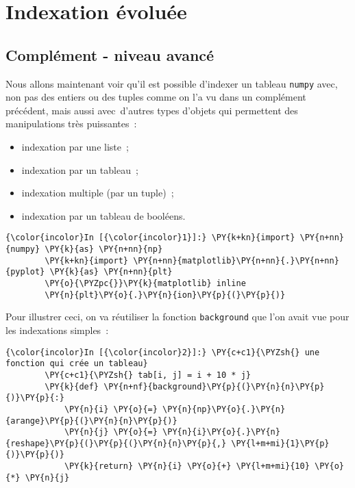     
    
    
    

    

    \hypertarget{indexation-uxe9voluuxe9e}{%
\section{Indexation évoluée}\label{indexation-uxe9voluuxe9e}}

    \hypertarget{compluxe9ment---niveau-avancuxe9}{%
\subsection{Complément - niveau
avancé}\label{compluxe9ment---niveau-avancuxe9}}

    Nous allons maintenant voir qu'il est possible d'indexer un tableau
\texttt{numpy} avec, non pas des entiers ou des tuples comme on l'a vu
dans un complément précédent, mais aussi avec~d'autres types d'objets
qui permettent des manipulations très puissantes~:

\begin{itemize}
\tightlist
\item
  indexation par une liste~;
\item
  indexation par un tableau~;
\item
  indexation multiple (par un tuple)~;
\item
  indexation par un tableau de booléens.
\end{itemize}

    \begin{Verbatim}[commandchars=\\\{\}]
{\color{incolor}In [{\color{incolor}1}]:} \PY{k+kn}{import} \PY{n+nn}{numpy} \PY{k}{as} \PY{n+nn}{np}
        \PY{k+kn}{import} \PY{n+nn}{matplotlib}\PY{n+nn}{.}\PY{n+nn}{pyplot} \PY{k}{as} \PY{n+nn}{plt}
        \PY{o}{\PYZpc{}}\PY{k}{matplotlib} inline
        \PY{n}{plt}\PY{o}{.}\PY{n}{ion}\PY{p}{(}\PY{p}{)}
\end{Verbatim}


    Pour illustrer ceci, on va réutiliser la fonction \texttt{background}
que l'on avait vue pour les indexations simples~:

    \begin{Verbatim}[commandchars=\\\{\}]
{\color{incolor}In [{\color{incolor}2}]:} \PY{c+c1}{\PYZsh{} une fonction qui crée un tableau}
        \PY{c+c1}{\PYZsh{} tab[i, j] = i + 10 * j}
        \PY{k}{def} \PY{n+nf}{background}\PY{p}{(}\PY{n}{n}\PY{p}{)}\PY{p}{:}
            \PY{n}{i} \PY{o}{=} \PY{n}{np}\PY{o}{.}\PY{n}{arange}\PY{p}{(}\PY{n}{n}\PY{p}{)}
            \PY{n}{j} \PY{o}{=} \PY{n}{i}\PY{o}{.}\PY{n}{reshape}\PY{p}{(}\PY{p}{(}\PY{n}{n}\PY{p}{,} \PY{l+m+mi}{1}\PY{p}{)}\PY{p}{)}
            \PY{k}{return} \PY{n}{i} \PY{o}{+} \PY{l+m+mi}{10} \PY{o}{*} \PY{n}{j}
\end{Verbatim}


